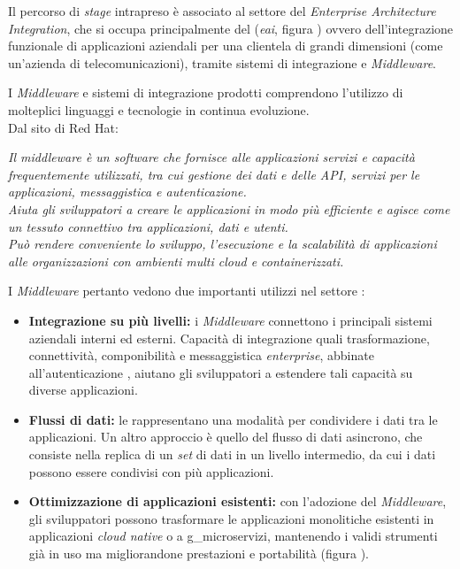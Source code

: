 Il percorso di \textit{stage} intrapreso è associato al settore del \textit{Enterprise Architecture Integration}, che si occupa principalmente del  (\textit{\acrlong{eai}}, figura \thefigure) ovvero dell'integrazione funzionale di applicazioni aziendali per una clientela di grandi dimensioni (come un'azienda di telecomunicazioni), tramite sistemi di integrazione e \textit{Middleware}.

I \textit{Middleware} e sistemi di integrazione prodotti comprendono l'utilizzo di molteplici linguaggi e tecnologie in continua evoluzione.\\
Dal sito di Red Hat:
\begin{displayquote}
  \textit{Il middleware è un software che fornisce alle applicazioni servizi e capacità frequentemente utilizzati, tra cui gestione dei dati e delle API, servizi per le applicazioni, messaggistica e autenticazione.\\
  Aiuta gli sviluppatori a creare le applicazioni in modo più efficiente e agisce come un tessuto connettivo tra applicazioni, dati e utenti.\\
  Può rendere conveniente lo sviluppo, l'esecuzione e la scalabilità di applicazioni alle organizzazioni con ambienti multi cloud e containerizzati.}
\end{displayquote}
\noindent
I \textit{Middleware} pertanto vedono due importanti utilizzi nel settore :
\begin{itemize}
  \item \textbf{Integrazione su più livelli:} i \textit{Middleware} connettono i principali sistemi aziendali interni ed esterni. Capacità di integrazione quali trasformazione, connettività, componibilità e messaggistica \textit{enterprise}, abbinate all'autenticazione , aiutano gli sviluppatori a estendere tali capacità su diverse applicazioni.
  \item \textbf{Flussi di dati:} le  rappresentano una modalità per condividere i dati tra le applicazioni. Un altro approccio è quello del flusso di dati asincrono, che consiste nella replica di un \textit{set} di dati in un livello intermedio, da cui i dati possono essere condivisi con più applicazioni.
  \item \textbf{Ottimizzazione di applicazioni esistenti:} con l'adozione del \textit{Middleware}, gli sviluppatori possono trasformare le applicazioni monolitiche esistenti in applicazioni \textit{cloud native} o a \gls{g_microservizi}, mantenendo i validi strumenti già in uso ma migliorandone prestazioni e portabilità (figura \thefigure).
\end{itemize}

